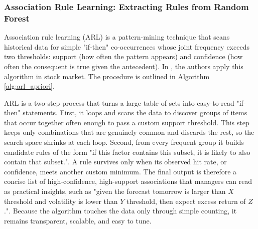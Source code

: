 

\subsubsection{Association Rule Learning: Extracting Rules from Random Forest}
Association rule learning (ARL) is a pattern-mining technique that scans historical data for simple "if-then" co-occurrences whose joint frequency exceeds two thresholds: support (how often the pattern appears) and confidence (how often the consequent is true given the antecedent). In , the authors apply this algorithm in stock market. The procedure is outlined in Algorithm \ref{alg:arl_apriori}.

ARL is a two-step process that turns a large table of sets into easy-to-read "if-then" statements.  First, it loops and scans the data to discover groups of items that occur together often enough to pass a custom support threshold. This step keeps only combinations that are genuinely common and discards the rest, so the search space shrinks at each loop.  Second, from every frequent group it builds candidate rules of the form "if this factor contains this subset, it is likely to also contain that subset.". A rule survives only when its observed hit rate, or confidence, meets another custom minimum. The final output is therefore a concise list of high-confidence, high-support associations that managers can read as practical insights, such as "given the forecast tomorrow is larger than $X$ threshold and volatility is lower than $Y$ threshold, then expect excess return of $Z$.". Because the algorithm touches the data only through simple counting, it remains transparent, scalable, and easy to tune.



